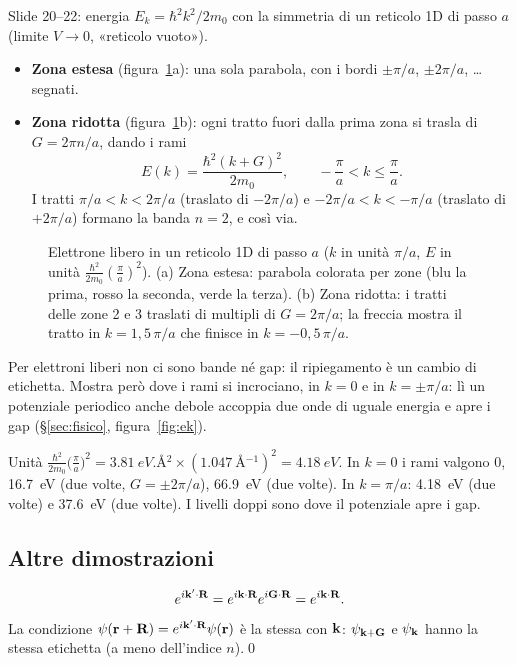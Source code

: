 \documentclass[11pt,a4paper]{article}
\begin{document}
Slide 20--22: energia $E_k=\hbar^2k^2/2m_0$ con la simmetria di un reticolo 1D di passo $a$ (limite $V\to0$, «reticolo vuoto»).
\begin{itemize}[leftmargin=*]
\item \textbf{Zona estesa} (figura~\ref{fig:zone}a): una sola parabola, con i bordi $\pm\pi/a$, $\pm2\pi/a$, \dots segnati.
\item \textbf{Zona ridotta} (figura~\ref{fig:zone}b): ogni tratto fuori dalla prima zona si trasla di $G=2\pi n/a$, dando i rami
\[
E(k)=\frac{\hbar^2(k+G)^2}{2m_0},\qquad -\frac\pi a<k\le\frac\pi a .
\]
I tratti $\pi/a<k<2\pi/a$ (traslato di $-2\pi/a$) e $-2\pi/a<k<-\pi/a$ (traslato di $+2\pi/a$) formano la banda $n=2$, e così via.
\end{itemize}

\begin{figure}[tbp]
\centering
{}
\caption{Elettrone libero in un reticolo 1D di passo $a$ ($k$ in unità $\pi/a$, $E$ in unità $\frac{\hbar^2}{2m_0}(\frac\pi a)^2$). (a) Zona estesa: parabola colorata per zone
(blu la prima, rosso la seconda, verde la terza). (b) Zona ridotta: i tratti delle zone 2 e 3 traslati di multipli di $G=2\pi/a$; la freccia mostra il tratto in
$k=1{,}5\,\pi/a$ che finisce in $k=-0{,}5\,\pi/a$.}\label{fig:zone}
\end{figure}

\begin{risultato}
Per elettroni liberi non ci sono bande né gap: il ripiegamento è un cambio di etichetta. Mostra però dove i rami si incrociano, in $k=0$ e in $k=\pm\pi/a$:
lì un potenziale periodico anche debole accoppia due onde di uguale energia e apre i gap (§\ref{sec:fisico}, figura~\ref{fig:ek}).
\end{risultato}

\begin{esempio}[$a=\SI{3}{\angstrom}$]
Unità $\frac{\hbar^2}{2m_0}\bigl(\frac\pi a\bigr)^2=\SI{3.81}{eV.\angstrom^2}\times(\SI{1.047}{\angstrom^{-1}})^2=\SI{4.18}{eV}$. In $k=0$ i rami valgono $0$, \SI{16.7}{eV}
(due volte, $G=\pm2\pi/a$), \SI{66.9}{eV} (due volte). In $k=\pi/a$: \SI{4.18}{eV} (due volte) e \SI{37.6}{eV} (due volte). I livelli doppi sono dove il potenziale apre i gap.
\end{esempio}

\subsection{Altre dimostrazioni}
\begin{dimostrazione}
\[
e^{i\mathbf k'\cdot\mathbf R}=e^{i\mathbf k\cdot\mathbf R}e^{i\mathbf G\cdot\mathbf R}=e^{i\mathbf k\cdot\mathbf R}.
\]
La condizione $\psi(\mathbf r+\mathbf R)=e^{i\mathbf k'\cdot\mathbf R}\psi(\mathbf r)$ è la stessa con $\mathbf k$: $\psi_{\mathbf k+\mathbf G}$ e $\psi_{\mathbf k}$ hanno la stessa etichetta (a meno
dell'indice $n$).\qed
\end{dimostrazione}
\end{document}
